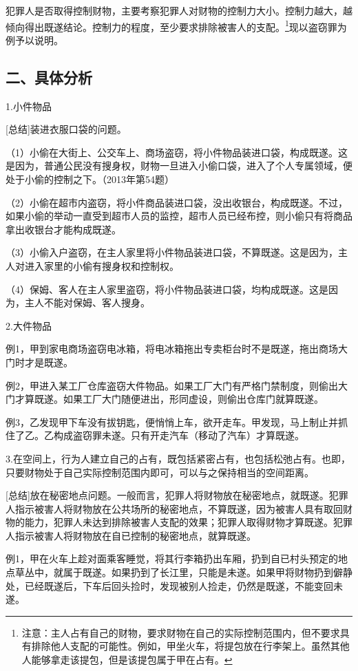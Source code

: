 犯罪人是否取得控制财物，主要考察犯罪人对财物的控制力大小。控制力越大，越倾向得出既遂结论。控制力的程度，至少要求排除被害人的支配。\footnote{注意：主人占有自己的财物，要求财物在自己的实际控制范围内，但不要求具有排除他人支配的可能性。例如，甲坐火车，将提包放在行李架上。虽然其他人能够拿走该提包，但是该提包属于甲在占有。}现以盗窃罪为例予以说明。

\subsection*{二、具体分析}

1.小件物品

[总结]装进衣服口袋的问题。

（1）小偷在大街上、公交车上、商场盗窃，将小件物品装进口袋，构成既遂。这是因为，普通公民没有搜身权，财物一旦进入小偷口袋，进入了个人专属领域，便处于小偷的控制之下。（2013年第54题）

（2）小偷在超市内盗窃，将小件商品装进口袋，没出收银台，构成既遂。不过，如果小偷的举动一直受到超市人员的监控，超市人员已经布控，则小偷只有将商品拿出收银台才能构成既遂。

（3）小偷入户盗窃，在主人家里将小件物品装进口袋，不算既遂。这是因为，主人对进入家里的小偷有搜身权和控制权。

（4）保姆、客人在主人家里盗窃，将小件物品装进口袋，均构成既遂。这是因为，主人不能对保姆、客人搜身。

2.大件物品

例1，甲到家电商场盗窃电冰箱，将电冰箱拖出专卖柜台时不是既遂，拖出商场大门时才是既遂。

例2，甲进入某工厂仓库盗窃大件物品。如果工厂大门有严格门禁制度，则偷出大门才算既遂。如果工厂大门随便进出，形同虚设，则偷出仓库门就算既遂。

例3，乙发现甲下车没有拔钥匙，便悄悄上车，欲开走车。甲发现，马上制止并抓住了乙。乙构成盗窃罪未遂。只有开走汽车（移动了汽车）才算既遂。

3.在空间上，行为人建立自己的占有，既包括紧密占有，也包括松弛占有。也即，只要财物处于自己实际控制范围内即可，可以与之保持相当的空间距离。

[总结]放在秘密地点问题。一般而言，犯罪人将财物放在秘密地点，就既遂。犯罪人指示被害人将财物放在公共场所的秘密地点，不算既遂，因为被害人具有取回财物的能力，犯罪人未达到排除被害人支配的效果；犯罪人取得财物才算既遂。犯罪人指示被害人将财物放在自已控制的秘密地点，就算既遂。

例1，甲在火车上趁对面乘客睡觉，将其行李箱扔出车厢，扔到自已村头预定的地点草丛中，就属于既遂。如果扔到了长江里，只能是未遂。如果甲将财物扔到僻静处，已经既遂后，下车后回头捡时，发现被别人捡走，仍然是既遂，不能变回未遂。

